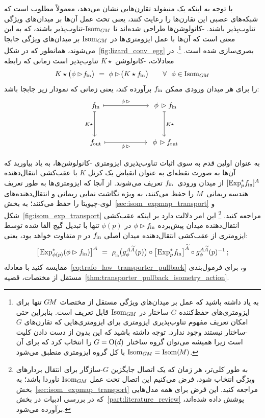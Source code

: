 با توجه به اینکه یک منیفولد تقارن‌هایی نشان می‌دهد، معمولاً مطلوب است که شبکه‌های عصبی این تقارن‌ها را رعایت کنند، یعنی تحت عمل آن‌ها بر میدان‌های ویژگی تناوب‌پذیر باشند.
\GM-کانولوشن‌ها طراحی شده‌اند تا $\operatorname{Isom}_{G\mkern-1.4muM}$-تناوب‌پذیر باشند، که به این معنی است که آن‌ها با عمل ایزومتری‌ها در $\operatorname{Isom}_{G\mkern-1.4muM}$ بر میدان‌های ویژگی جابجا می‌شوند، همانطور که در شکل~\ref{fig:lizard_conv_egg} بصری‌سازی شده است.%
\footnote{
	به یاد داشته باشید که عمل بر میدان‌های ویژگی مستقل از مختصات $G\mkern-1.4muM$ تنها برای ایزومتری‌های حفظ‌کننده $G$-ساختار در $\operatorname{Isom}_{G\mkern-1.4muM}$ قابل تعریف است.
	بنابراین حتی امکان تعریف مفهوم تناوب‌پذیری ایزومتری برای ایزومتری‌هایی که تقارن‌های $G$-ساختار نیستند وجود ندارد.
	توجه داشته باشید که این بدون از دست دادن کلیت است زیرا همیشه می‌توان گروه ساختار $G=\operatorname{O}(d)$ را انتخاب کرد که برای آن $\operatorname{Isom}_{G\mkern-1.4muM}=\operatorname{Isom}(\mkern-1.5mu M \mkern-.5mu)$ با کل گروه ایزومتری منطبق می‌شود.
}.
در معادلات، \GM-کانولوشن $K\star$ تناوب‌پذیر است زمانی که رابطه
\begin{align}\label{eq:isometry_equivariance_conv_def_33}
	K \star \big( \phi\rhd\! \fin \big) \ =\ \phi\rhd\! \big( K \star \fin \big)
	\qquad \forall\ \ \phi\in \IsomGM
\end{align}
را برای هر میدان ورودی ممکن $f_\textup{\;\!\!in}$ برآورده کند، یعنی زمانی که نمودار زیر جابجا باشد:
\begin{equation}\label{cd:isometry_equivariance_conv_mapsto}
	\begin{tikzcd}[column sep=60pt, row sep=35, font=\normalsize]
		\fin
		\arrow[r, "\phi\,\rhd", mapsto]
		\arrow[d, "K\star"', mapsto]
		&
		\phi\,\rhd \fin
		\arrow[d, "K\star", mapsto]
		\\
		\fout
		\arrow[r, "\phi\,\rhd"', mapsto]
		&
		\phi\,\rhd \fout
	\end{tikzcd}
\end{equation}


به عنوان اولین قدم به سوی اثبات تناوب‌پذیری ایزومتری \GM-کانولوشن‌ها، به یاد بیاورید که آن‌ها به صورت نقطه‌ای به عنوان انقباض یک کرنل $K$ با عقب‌کشی انتقال‌دهنده $[\operatorname{Exp}^*_p\mkern-2mu f_\textup{\;\!\!in}]^A$ از میدان ورودی~$f_\textup{\;\!\!in}$ تعریف می‌شوند.
از آنجا که ایزومتری‌ها به طور تعریف هندسه ریمانی~$M$ را حفظ می‌کنند، به ویژه نگاشت نمایی ریمانی و انتقال‌دهنده‌های لوی-چیویتا را حفظ می‌کنند؛ به بخش~\ref{sec:isom_expmap_transport} و شکل~\ref{fig:isom_exp_transport} مراجعه کنید.%
\footnote{
	به طور کلی‌تر، هر زمان که یک اتصال جایگزین $G$-سازگار برای انتقال بردارهای ویژگی انتخاب شود، فرض می‌کنیم این اتصال تحت عمل $\operatorname{Isom}_{G\mkern-1.4muM}$ ناوردا باشد؛ به بخش~\ref{sec:isom_expmap_transport} مراجعه کنید.
	این فرض برای همه مدل‌هایی که در بررسی ادبیات در بخش~\ref{part:literature_review} پوشش داده شده‌اند، برآورده می‌شود.
}
این امر دلالت دارد بر اینکه عقب‌کشی انتقال‌دهنده میدان پیش‌برده $\phi\rhd f_\textup{\;\!\!in}$ در $\phi(p)$ تنها با تبدیل گیج القا شده توسط ایزومتری از عقب‌کشی انتقال‌دهنده میدان اصلی $f_\textup{\;\!\!in}$ در $p$ متفاوت خواهد بود، یعنی:
\begin{align}\label{eq:transporter_pullback_pushforward_field}
	\big[\mkern-2mu \Expsphip (\phi\rhd\fin) \big]^A\ =\ 
	\rhoin\big( g_\phi^{A\widetilde{A}}(p)\big) \circ \big[\mkern-2mu \Expspfin\big]^{\widetilde{A}} \circ g_\phi^{A\widetilde{A}}(p)^{-1} \,;
\end{align}
مقایسه کنید با معادله~\eqref{eq:trafo_law_transporter_pullback} و، برای فرمول‌بندی مستقل از مختصات، قضیه~\ref{thm:transporter_pullback_isometry_action}.


